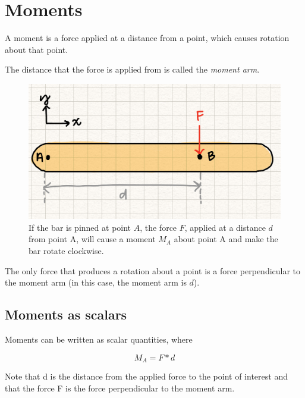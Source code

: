 \section{Moments}


A moment is a force applied at a distance from a point, which causes rotation about that point. 

The distance that the force is applied from is called the \textit{moment arm}. 

\begin{figure}[!h]
\centering
\includegraphics[angle=0, width=5in]{MomentsFigures/Moment.jpg}
\vspace{-2mm}
\caption{\small If the bar is pinned at point $A$, the force $F$, applied at a distance $d$ from point A, will cause a moment $M_A$ about point A and make the bar rotate clockwise.}
\vspace{-3mm}
\label{Fig:Moment}
\end{figure}

The only force that produces a rotation about a point is a force perpendicular to the moment arm (in this case, the moment arm is $d$).


\subsection{Moments as scalars}

Moments can be written as scalar quantities, where 

\[{M_A} = F*d\]

Note that d is the distance from the applied force to the point of interest and that the force F is the force perpendicular to the moment arm. 

